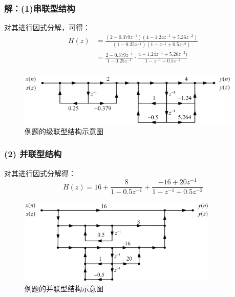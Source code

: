 \documentclass[notheorems,compress,mathserif,table]{beamer}
\begin{document}
\begin{frame}\frametitle{解：(1)串联型结构}%

对其进行因式分解，可得：
\begin{equation}
\begin{split}
H(z) &= \frac{(2-0.379z^{-1})(4-1.24z^{-1}+5.26z^{-2})}{(1-0.25z^{-1})(1-z^{-1}+0.5z^{-2})}\\
     &= \frac{2-0.379z^{-1}}{1-0.25z^{-1}}\cdot\frac{4-1.24z^{-1}+5.26z^{-2})}{1-z^{-1}+0.5z^{-2}}\\
\end{split}
\end{equation}

\begin{figure}[h]
\centering
\includegraphics[width=0.95\textwidth]{jilianxingli.jpg}
\caption{例题的级联型结构示意图}
\label{chp5:jibenliutu}
\end{figure}

\end{frame}
\begin{frame}\frametitle{(2) 并联型结构}%
对其进行因式分解得：
$$H(z) = 16 +\frac{8}{1-0.5z^{-1}}+\frac{-16 +20z^{-1}}{1-z^{-1}+0.5z^{-2}}$$
\pause
\begin{figure}[h]
\centering
\includegraphics[width=0.85\textwidth]{binglianxingli.jpg}
\caption{例题的并联型结构示意图}
\label{chp5:jibenliutu}
\end{figure}
\end{frame}
\end{document}
